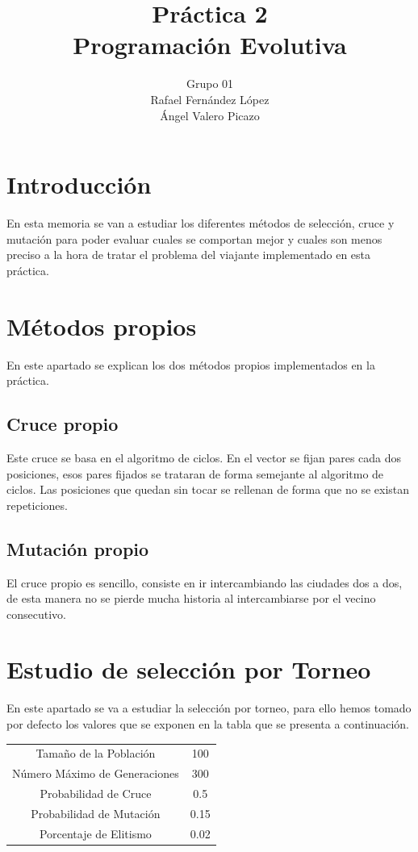 \documentclass[12pt]{article}
\title{Práctica 2\\Programación Evolutiva}
\author{Grupo 01\\Rafael Fernández López\\Ángel Valero Picazo}
\date{}
\begin{document}
\maketitle
\newpage
\newpage
\tableofcontents
\newpage

\section{Introducción}

	En esta memoria se van a estudiar los diferentes métodos de selección, cruce y mutación para poder evaluar cuales se comportan mejor y cuales son menos preciso a la hora de tratar el problema del viajante implementado en esta práctica.

\section{Métodos propios}

	En este apartado se explican los dos métodos propios implementados en la práctica.

\subsection{Cruce propio}

	Este cruce se basa en el algoritmo de ciclos. En el vector se fijan pares cada dos posiciones, esos pares fijados se trataran de forma semejante al algoritmo de ciclos. Las posiciones que quedan sin tocar se rellenan de forma que no se existan repeticiones. 

\subsection{Mutación propio}

	El cruce propio es sencillo, consiste en ir intercambiando las ciudades dos a dos, de esta manera no se pierde mucha historia al intercambiarse por el vecino consecutivo.

\section{Estudio de selección por Torneo}

En este apartado se va a estudiar la selección por torneo, para ello hemos tomado por defecto los valores que se exponen en la tabla que se presenta a continuación.

\begin{table}[H]
\begin{center}
\begin{tabular}{|cc|} \hline
Tamaño de la Población   & 100  \\  
Número Máximo de Generaciones  &  300 \\
Probabilidad de Cruce & 0.5 \\
Probabilidad de Mutación & 0.15 \\
Porcentaje de Elitismo & 0.02 \\ \hline
\end{tabular}
\end{center}
\end{table}
\end{document}
